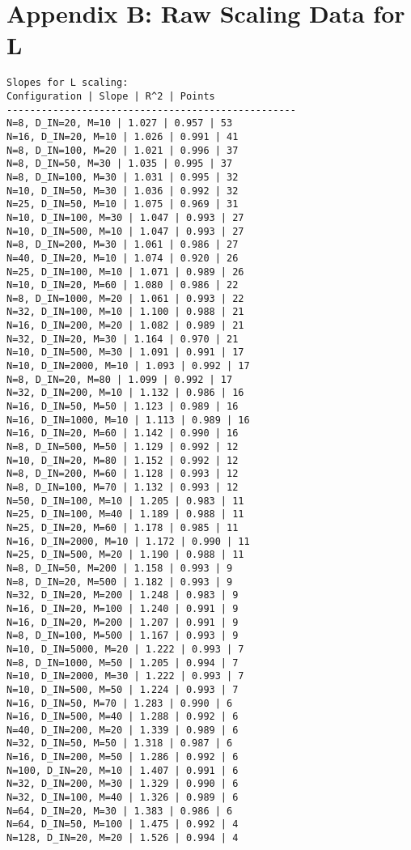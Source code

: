 \documentclass{article}
\begin{document}
\section*{Appendix B: Raw Scaling Data for L}
\begin{verbatim}
Slopes for L scaling:
Configuration | Slope | R^2 | Points
--------------------------------------------------
N=8, D_IN=20, M=10 | 1.027 | 0.957 | 53
N=16, D_IN=20, M=10 | 1.026 | 0.991 | 41
N=8, D_IN=100, M=20 | 1.021 | 0.996 | 37
N=8, D_IN=50, M=30 | 1.035 | 0.995 | 37
N=8, D_IN=100, M=30 | 1.031 | 0.995 | 32
N=10, D_IN=50, M=30 | 1.036 | 0.992 | 32
N=25, D_IN=50, M=10 | 1.075 | 0.969 | 31
N=10, D_IN=100, M=30 | 1.047 | 0.993 | 27
N=10, D_IN=500, M=10 | 1.047 | 0.993 | 27
N=8, D_IN=200, M=30 | 1.061 | 0.986 | 27
N=40, D_IN=20, M=10 | 1.074 | 0.920 | 26
N=25, D_IN=100, M=10 | 1.071 | 0.989 | 26
N=10, D_IN=20, M=60 | 1.080 | 0.986 | 22
N=8, D_IN=1000, M=20 | 1.061 | 0.993 | 22
N=32, D_IN=100, M=10 | 1.100 | 0.988 | 21
N=16, D_IN=200, M=20 | 1.082 | 0.989 | 21
N=32, D_IN=20, M=30 | 1.164 | 0.970 | 21
N=10, D_IN=500, M=30 | 1.091 | 0.991 | 17
N=10, D_IN=2000, M=10 | 1.093 | 0.992 | 17
N=8, D_IN=20, M=80 | 1.099 | 0.992 | 17
N=32, D_IN=200, M=10 | 1.132 | 0.986 | 16
N=16, D_IN=50, M=50 | 1.123 | 0.989 | 16
N=16, D_IN=1000, M=10 | 1.113 | 0.989 | 16
N=16, D_IN=20, M=60 | 1.142 | 0.990 | 16
N=8, D_IN=500, M=50 | 1.129 | 0.992 | 12
N=10, D_IN=20, M=80 | 1.152 | 0.992 | 12
N=8, D_IN=200, M=60 | 1.128 | 0.993 | 12
N=8, D_IN=100, M=70 | 1.132 | 0.993 | 12
N=50, D_IN=100, M=10 | 1.205 | 0.983 | 11
N=25, D_IN=100, M=40 | 1.189 | 0.988 | 11
N=25, D_IN=20, M=60 | 1.178 | 0.985 | 11
N=16, D_IN=2000, M=10 | 1.172 | 0.990 | 11
N=25, D_IN=500, M=20 | 1.190 | 0.988 | 11
N=8, D_IN=50, M=200 | 1.158 | 0.993 | 9
N=8, D_IN=20, M=500 | 1.182 | 0.993 | 9
N=32, D_IN=20, M=200 | 1.248 | 0.983 | 9
N=16, D_IN=20, M=100 | 1.240 | 0.991 | 9
N=16, D_IN=20, M=200 | 1.207 | 0.991 | 9
N=8, D_IN=100, M=500 | 1.167 | 0.993 | 9
N=10, D_IN=5000, M=20 | 1.222 | 0.993 | 7
N=8, D_IN=1000, M=50 | 1.205 | 0.994 | 7
N=10, D_IN=2000, M=30 | 1.222 | 0.993 | 7
N=10, D_IN=500, M=50 | 1.224 | 0.993 | 7
N=16, D_IN=50, M=70 | 1.283 | 0.990 | 6
N=16, D_IN=500, M=40 | 1.288 | 0.992 | 6
N=40, D_IN=200, M=20 | 1.339 | 0.989 | 6
N=32, D_IN=50, M=50 | 1.318 | 0.987 | 6
N=16, D_IN=200, M=50 | 1.286 | 0.992 | 6
N=100, D_IN=20, M=10 | 1.407 | 0.991 | 6
N=32, D_IN=200, M=30 | 1.329 | 0.990 | 6
N=32, D_IN=100, M=40 | 1.326 | 0.989 | 6
N=64, D_IN=20, M=30 | 1.383 | 0.986 | 6
N=64, D_IN=50, M=100 | 1.475 | 0.992 | 4
N=128, D_IN=20, M=20 | 1.526 | 0.994 | 4
\end{verbatim}
\end{document}
